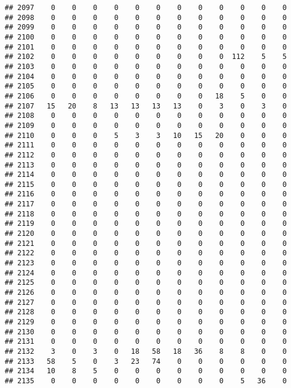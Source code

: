 \documentclass[]{article}
\begin{document}
\begin{verbatim}
## 2097    0    0    0    0    0    0    0    0    0    0    0    0
## 2098    0    0    0    0    0    0    0    0    0    0    0    0
## 2099    0    0    0    0    0    0    0    0    0    0    0    0
## 2100    0    0    0    0    0    0    0    0    0    0    0    0
## 2101    0    0    0    0    0    0    0    0    0    0    0    0
## 2102    0    0    0    0    0    0    0    0    0  112    5    5
## 2103    0    0    0    0    0    0    0    0    0    0    0    0
## 2104    0    0    0    0    0    0    0    0    0    0    0    0
## 2105    0    0    0    0    0    0    0    0    0    0    0    0
## 2106    0    0    0    0    0    0    0    0   18    5    0    0
## 2107   15   20    8   13   13   13   13    0    3    0    3    0
## 2108    0    0    0    0    0    0    0    0    0    0    0    0
## 2109    0    0    0    0    0    0    0    0    0    0    0    0
## 2110    0    0    0    5    3    3   10   15   20    0    0    0
## 2111    0    0    0    0    0    0    0    0    0    0    0    0
## 2112    0    0    0    0    0    0    0    0    0    0    0    0
## 2113    0    0    0    0    0    0    0    0    0    0    0    0
## 2114    0    0    0    0    0    0    0    0    0    0    0    0
## 2115    0    0    0    0    0    0    0    0    0    0    0    0
## 2116    0    0    0    0    0    0    0    0    0    0    0    0
## 2117    0    0    0    0    0    0    0    0    0    0    0    0
## 2118    0    0    0    0    0    0    0    0    0    0    0    0
## 2119    0    0    0    0    0    0    0    0    0    0    0    0
## 2120    0    0    0    0    0    0    0    0    0    0    0    0
## 2121    0    0    0    0    0    0    0    0    0    0    0    0
## 2122    0    0    0    0    0    0    0    0    0    0    0    0
## 2123    0    0    0    0    0    0    0    0    0    0    0    0
## 2124    0    0    0    0    0    0    0    0    0    0    0    0
## 2125    0    0    0    0    0    0    0    0    0    0    0    0
## 2126    0    0    0    0    0    0    0    0    0    0    0    0
## 2127    0    0    0    0    0    0    0    0    0    0    0    0
## 2128    0    0    0    0    0    0    0    0    0    0    0    0
## 2129    0    0    0    0    0    0    0    0    0    0    0    0
## 2130    0    0    0    0    0    0    0    0    0    0    0    0
## 2131    0    0    0    0    0    0    0    0    0    0    0    0
## 2132    3    0    3    0   18   58   18   36    8    8    0    0
## 2133   58    5    0    3   23   74    0    0    0    0    0    0
## 2134   10    8    5    0    0    0    0    0    0    0    0    0
## 2135    0    0    0    0    0    0    0    0    0    5   36    0

\end{verbatim}
\end{document}
